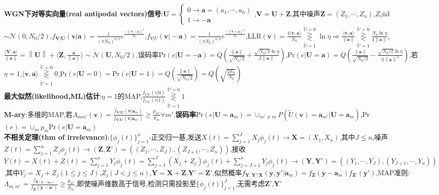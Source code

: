 \documentclass[UTF8,a4paper,10pt]{article}
\providecommand{\norm}[1]{\left\lVert#1\right\rVert}
\begin{document}
\begin{multicols*}{2}
    \textbf{WGN下对等实向量(real antipodal vectors)信号}:$\bm{U}=\left\{\begin{array}{l}
        0\rightarrow\bm{a}=(a_1,\cdots,a_n)\\
        1\rightarrow-\bm{a}
    \end{array}\right.$,$\bm{V}=\bm{U}+\bm{Z}$,其中噪声$\bm{Z}=(Z_1,\cdots,Z_n)$,$Z_i$iid$\sim\mathcal{N}(0,N_0/2)$,$f_{\bm{V}\vert\bm{U}}(\bm{v}\vert\bm{a})=\frac{1}{(\pi N_0)^{n/2}}e^{\frac{-\norm{\bm{v}-\bm{a}}^2}{N_0}}$,$f_{V\vert U}(\bm{v}\vert-\bm{a})=\frac{1}{(\pi N_0)^{n/2}}e^{\frac{-\norm{\bm{v}+\bm{a}}^2}{N_0}}$,LLR$(\bm{v})=\frac{4\langle\bm{v},\bm{a}\rangle}{N_0}\underset{\tilde{U}=1}{\overset{\tilde{U}=0}{\gtreqless}}\ln\eta\Rightarrow\frac{\langle\bm{v},\bm{a}\rangle}{\norm{\bm{a}}}\underset{\tilde{U}=1}{\overset{\tilde{U}=0}{\gtreqless}}\frac{N_0\ln\eta}{4\norm{\bm{a}}}$,$\frac{\langle\bm{V},\bm{a}\rangle}{\norm{\bm{a}}}=\norm{\bm{U}}+\langle\bm{Z},\frac{\bm{a}}{\norm{\bm{a}}}\rangle\sim\mathcal{N}(\bm{U},N_0/2)$,误码率Pr$(e\vert\bm{U}=-\bm{a})=Q(\frac{\norm{\bm{a}}}{\sqrt{N_0/2}}+\frac{\sqrt{N_0/2}\ln\eta}{2\norm{\bm{a}}})$,Pr$(e\vert\bm{U}=\bm{a})=Q(\frac{\norm{\bm{a}}}{\sqrt{N_0/2}}-\frac{\sqrt{N_0/2}\ln\eta}{2\norm{\bm{a}}^2})$,若$\eta=1$,$\langle\bm{v},\bm{a}\rangle\underset{\tilde{U}=1}{\overset{\tilde{U}=0}{\gtreqless}}0$,Pr$(e\vert\bm{U}=0)=\mathrm{Pr}(e\vert\bm{U}=1)=Q(\frac{\norm{\bm{a}}}{\sqrt{N_0/2}})=Q(\sqrt{\frac{2E_b}{N_0}})$\\
\textbf{最大似然(likelihood,ML)估计}:$\eta=1$的MAP,$\frac{f_{V\vert U}(v\vert 0)}{f_{V\vert U}(v\vert 1)}\underset{\tilde{U}=1}{\overset{\tilde{U}=0}{\gtreqless}}1$\\
\textbf{M-ary}:多维的MAP,若$\Lambda_{mm'}(\bm{v})=\frac{f_{\bm{V}\vert\bm{U}}(\bm{v}\vert\bm{a}_m)}{f_{\bm{V}\vert\bm{U}}(\bm{v}\vert\bm{a}_{m'})}\geq\frac{p_{m'}}{p_m}\forall m'$,\textbf{误码率}Pr$(e\vert\bm{U}=\bm{a}_m)=\cup_{m'\neq m}P(\tilde{U}(\bm{v})=\bm{a}_{m'}\vert\bm{U}=\bm{a}_m)$,Pr$(e)=\cup_{m}p_m\mathrm{Pr}(e\vert\bm{U}=\bm{a}_m)$\\
\textbf{不相关定理(thm of irrelevance)}:$\{\phi_j(t)\}_{j=1}^n$-正交归一基,发送$X(t)=\sum_{j=1}^JX_j\phi_j(t)\rightarrow\bm{X}=(X_1,X_n)$,其中$J\leq n$,噪声$Z(t)=\sum_{j=1}^nZ_j\phi_j(t)\rightarrow(\bm{Z},\bm{Z}')=((Z_1,\cdots,Z_J),(Z_{J+1},\cdots,Z_n))$,接收$Y(t)=X(t)+Z(t)=\sum_{j=1}^nY_j\phi_j(t)=\sum_{j=1}^J(X_j+Z_j)\phi_j(t)+\sum_{j=J+1}^nY_j\phi_j(t)\rightarrow(\bm{Y},\bm{Y}')=((Y_1,\cdots,Y_J),(Y_{J+1},\cdots,Y_n))$,其中$Y_j=X_j+Z_j(1\leq j\leq J)$,$Z_j(J<j\leq n)$,$\bm{Y}=\bm{X}+\bm{Z}$,$\bm{Y}'=\bm{Z}'$,似然概率$f_{\bm{Y},\bm{Y}'\vert\bm{X}}(\bm{y},\bm{y}'\vert\bm{a}_m)=f_{\bm{Z}}(\bm{y}-\bm{a}_m)f_{\bm{Z}'}(\bm{y}')$,MAP准则:$\Lambda_{m,m'}=\frac{f_{\bm{Z}(\bm{y}-\bm{a}_m)}}{f_{\bm{Z}}(\bm{y}-\bm{a}')}\geq\frac{p_{m'}}{p_m}$,即使噪声维数高于信号,检测只需投影至$\{\phi_j(t)\}_{j=1}^J$,无需考虑$\bm{Z}'$,$\bm{Y}'$\\

\end{multicols*}
\end{document}
